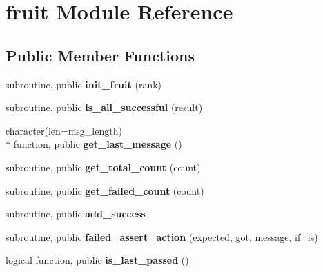 \hypertarget{classfruit}{\section{fruit Module Reference}
\label{classfruit}
}
\subsection*{Public Member Functions}
\begin{DoxyCompactItemize}
\item 
\hypertarget{classfruit_ab3a7959a1a6136adb756f13ca9387dd6}{subroutine, public {\bfseries init\-\_\-fruit} (rank)}\label{classfruit_ab3a7959a1a6136adb756f13ca9387dd6}

\item 
\hypertarget{classfruit_ac40407937895b6cb10fa0648674d1f16}{subroutine, public {\bfseries is\-\_\-all\-\_\-successful} (result)}\label{classfruit_ac40407937895b6cb10fa0648674d1f16}

\item 
\hypertarget{classfruit_acf36c5dabe7e9f1b174f178af7e543fe}{character(len=msg\-\_\-length) \\*
function, public {\bfseries get\-\_\-last\-\_\-message} ()}\label{classfruit_acf36c5dabe7e9f1b174f178af7e543fe}

\item 
\hypertarget{classfruit_af4638a28ec65153421c0cd2ec5c90592}{subroutine, public {\bfseries get\-\_\-total\-\_\-count} (count)}\label{classfruit_af4638a28ec65153421c0cd2ec5c90592}

\item 
\hypertarget{classfruit_ab46f9d1a557595a8d602b0d74097c34c}{subroutine, public {\bfseries get\-\_\-failed\-\_\-count} (count)}\label{classfruit_ab46f9d1a557595a8d602b0d74097c34c}

\item 
\hypertarget{classfruit_ae64f3e1d3fdc86f945e98ff243bf4de7}{subroutine, public {\bfseries add\-\_\-success}}\label{classfruit_ae64f3e1d3fdc86f945e98ff243bf4de7}

\item 
\hypertarget{classfruit_a9e5cbf8c56d87385d498e1cb3b361d42}{subroutine, public {\bfseries failed\-\_\-assert\-\_\-action} (expected, got, message, if\-\_\-is)}\label{classfruit_a9e5cbf8c56d87385d498e1cb3b361d42}

\item 
\hypertarget{classfruit_aa2be18790d593acee8d47ea95f86aba4}{logical function, public {\bfseries is\-\_\-last\-\_\-passed} ()}\label{classfruit_aa2be18790d593acee8d47ea95f86aba4}


\end{DoxyCompactItemize}
